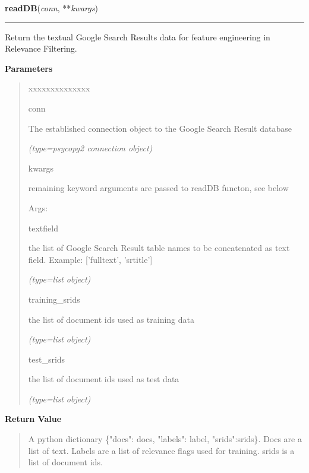 \hspace{.8\funcindent}\begin{boxedminipage}{\funcwidth}

    \raggedright \textbf{readDB}(\textit{conn}, **\textit{kwargs})

    \vspace{-1.5ex}

    \rule{\textwidth}{0.5\fboxrule}
\setlength{\parskip}{2ex}
    Return the textual Google Search Results data for feature engineering 
    in Relevance Filtering.

\setlength{\parskip}{1ex}
      \textbf{Parameters}
      \vspace{-1ex}

      \begin{quote}
        \begin{Ventry}{xxxxxxxxxxxxxx}

          \item[conn]

          The established connection object to the Google Search Result 
          database

            {\it (type=psycopg2 connection object)}

          \item[kwargs]

          remaining keyword arguments are passed to readDB functon, see 
          below

          Args:

          \item[textfield]

          the list of Google Search Result table names to be concatenated 
          as text field. Example: ['fulltext', 'srtitle']

            {\it (type=list object)}

          \item[training\_srids]

          the list of document ids used as training data

            {\it (type=list object)}

          \item[test\_srids]

          the list of document ids used as test data

            {\it (type=list object)}

        \end{Ventry}

      \end{quote}

      \textbf{Return Value}
    \vspace{-1ex}

      \begin{quote}
      A python dictionary \{"docs": docs, "labels": label, "srids":srids\}.
      Docs are a list of text.  Labels are a list of relevance flags used 
      for training.  srids is a list of document ids.

      \end{quote}

    \end{boxedminipage}

